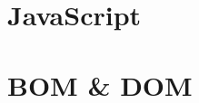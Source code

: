 \documentclass[a4paper,11pt]{article}
\begin{document}
\tt %
\pagestyle{header}
\sybmaketitle
\tableofcontents
\newpage

\pagestyle{main}
\setcounter{page}{1}

\part[JavaScript]{JavaScript}




\part[BOM \& DOM]{BOM \& DOM}

\end{document}
